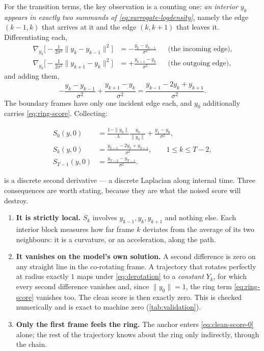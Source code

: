 \documentclass[11pt,a4paper]{article}
\begin{document}
For the transition terms, the key observation is a counting one: \emph{an interior $y_k$
appears in exactly two summands of \eqref{eq:surrogate-logdensity}}, namely the edge
$(k-1,k)$ that arrives at it and the edge $(k,k+1)$ that leaves it. Differentiating each,
\begin{align}
 \nabla_{y_k}\Big[-\tfrac{1}{2\sigma^2}\|y_k-y_{k-1}\|^2\Big]
 &=-\frac{y_k-y_{k-1}}{\sigma^2}
 &&\text{(the incoming edge),}
 \label{eq:edge-in}\\
 \nabla_{y_k}\Big[-\tfrac{1}{2\sigma^2}\|y_{k+1}-y_k\|^2\Big]
 &=+\frac{y_{k+1}-y_k}{\sigma^2}
 &&\text{(the outgoing edge),}
 \label{eq:edge-out}
\end{align}
and adding them,
\begin{equation}
 -\frac{y_k-y_{k-1}}{\sigma^2}+\frac{y_{k+1}-y_k}{\sigma^2}
 =\frac{y_{k-1}-2y_k+y_{k+1}}{\sigma^2} .
\end{equation}
The boundary frames have only one incident edge each, and $y_0$ additionally carries
\eqref{eq:ring-score}. Collecting:

\begin{keyresult}
\begin{align}
 S_0(y,0)&=\frac{1-\|y_0\|}{\lambda}\frac{y_0}{\|y_0\|}+\frac{y_1-y_0}{\sigma^2},
 \label{eq:clean-score-0}\\
 S_k(y,0)&=\frac{y_{k-1}-2y_k+y_{k+1}}{\sigma^2},\qquad 1\le k\le T-2,
 \label{eq:clean-score-k}\\
 S_{T-1}(y,0)&=\frac{y_{T-2}-y_{T-1}}{\sigma^2}.
 \label{eq:clean-score-T}
\end{align}
\end{keyresult}

 is a discrete second derivative --- a discrete Laplacian along
internal time. Three consequences are worth stating, because they are what the noised score
will destroy.

\begin{enumerate}
\item \textbf{It is strictly local.} $S_k$ involves $y_{k-1},y_k,y_{k+1}$ and nothing else.
      Each interior block measures how far frame $k$ deviates from the average of its two
      neighbours: it is a curvature, or an acceleration, along the path.
\item \textbf{It vanishes on the model's own solution.} A second difference is zero on any
      straight line in the co-rotating frame. A trajectory that rotates perfectly at radius
      exactly $1$ maps under \eqref{eq:derotation} to a \emph{constant} $Y_k$, for which every
      second difference vanishes and, since $\|y_0\|=1$, the ring term \eqref{eq:ring-score}
      vanishes too. The clean score is then exactly zero. This is checked numerically and is
      exact to machine zero (\cref{tab:validation}).
\item \textbf{Only the first frame feels the ring.} The anchor enters
      \eqref{eq:clean-score-0} alone; the rest of the trajectory knows about the ring only
      indirectly, through the chain.
\end{enumerate}
\end{document}
